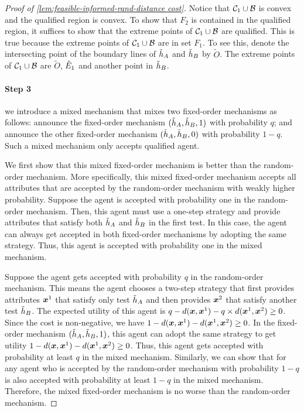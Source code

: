 \begin{proof}[Proof of \cref{lem:feasible-informed-rand-distance cost}]
Notice that $\mathcal{C}_1\cup \mathcal{B}$ is convex and the qualified region is convex.
To show that $F_2$ is contained in the qualified region, 
it suffices to show that the extreme points of $\mathcal{C}_1\cup \mathcal{B}$ are qualified.
This is true because the extreme points of $\mathcal{C}_1\cup \mathcal{B}$ are in set $F_1$.
To see this, denote the intersecting point of the boundary lines of $ \tilde{h}_A$ and $\tilde{h}_B$ by $\tilde O$.
The extreme points of $\mathcal{C}_1\cup \mathcal{B}$ are $\tilde O$, $\tilde{E}_1$ and another point in $ \tilde{h}_B$.

\paragraph{Step 3}
 we introduce a mixed mechanism that mixes two fixed-order mechanisms as follows:
     announce the fixed-order mechanism $(\tilde{h}_A,\tilde{h}_B,1)$ with probability $q$; and announce the other fixed-order mechanism $(\tilde{h}_A,\tilde{h}_B,0)$ with probability $1-q$. 
     Such a mixed mechanism only accepts qualified agent.
    
    We first show that this mixed fixed-order mechanism is better than the random-order mechanism.  
    More specifically, this mixed fixed-order mechanism accepts all attributes that are accepted by the random-order mechanism with weakly higher probability.
    Suppose the agent is accepted with probability one in the random-order mechanism. Then, this agent must use a one-step strategy and provide attributes that satisfy both $\tilde {h}_A$ and $\tilde {h}_B$ in the first test. In this case, the agent can always get accepted in both fixed-order mechanisms by adopting the same strategy. Thus, this agent is accepted with probability one in the mixed mechanism. 
    
    Suppose the agent gets accepted with probability $q$ in the random-order mechanism. This means the agent chooses a two-step strategy that first provides attributes $\boldsymbol{x}^1$ that satisfy only test $\tilde {h}_A$ and then provides $\boldsymbol{x}^2$ that satisfy another test $\tilde {h}_B$. 
    The expected utility of this agent is $q- d(\boldsymbol{x},\boldsymbol{x}^1)- q\times d(\boldsymbol{x}^1,\boldsymbol{x}^2) \geq 0$.  
    Since the cost is non-negative, we have $1- d(\boldsymbol{x},\boldsymbol{x}^1)-  d(\boldsymbol{x}^1,\boldsymbol{x}^2) \geq 0$.
    In the fixed-order mechanism $(\tilde{h}_A,\tilde{h}_B,1)$, this agent can adopt the same strategy to get utility $1- d(\boldsymbol{x},\boldsymbol{x}^1)-  d(\boldsymbol{x}^1,\boldsymbol{x}^2) \geq 0$.
    Thus, this agent gets accepted with probability at least $q$ in the mixed mechanism. 
    Similarly, we can show that for any agent who is accepted by the random-order mechanism with probability $1-q$ is also accepted with probability at least $1-q$ in the mixed mechanism.
    Therefore, the mixed fixed-order mechanism is no worse than the random-order mechanism. 
    

\end{proof}
